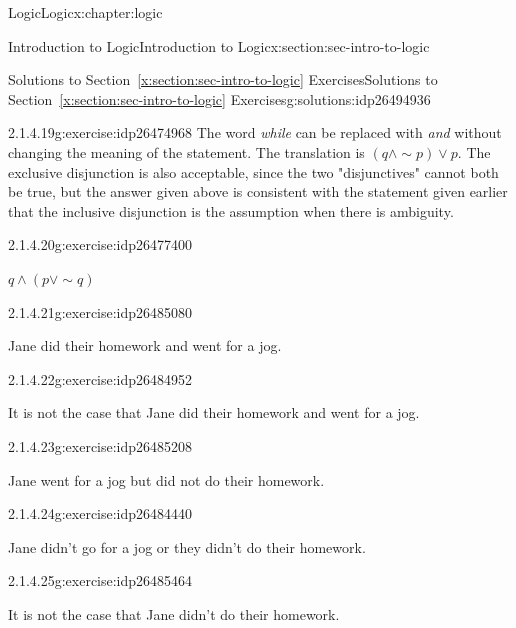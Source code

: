 \documentclass[twoside,10pt,]{book}
\newcommand{\xreffont}{\relax}
\numberwithin{equation}{section}
\begin{document}
\begin{chapterptx}{Logic}{}{Logic}{}{}{x:chapter:logic}
\begin{sectionptx}{Introduction to Logic}{}{Introduction to Logic}{}{}{x:section:sec-intro-to-logic}
\begin{solutions-subsection}{Solutions to Section~{\xreffont\ref*{x:section:sec-intro-to-logic}} Exercises}{}{Solutions to Section~{\xreffont\ref*{x:section:sec-intro-to-logic}} Exercises}{}{}{g:solutions:idp26494936}
\begin{exercisegroup}
\begin{divisionsolutioneg}{2.1.4.19}{}{g:exercise:idp26474968}
\noindent\hypertarget{g:solution:idp26481112-main}{}The word \emph{while} can be replaced with \emph{and} without changing the meaning of the statement. The translation is \((q{\wedge} \sim\!{p}){\vee} p\).  The exclusive disjunction is also acceptable, since the two "disjunctives" cannot both be true, but the answer given above is consistent with the statement given earlier that the inclusive disjunction is the assumption when there is ambiguity.\end{divisionsolutioneg}%
\begin{divisionsolutioneg}{2.1.4.20}{}{g:exercise:idp26477400}%
\par\smallskip%
\noindent\hypertarget{g:solution:idp26482648-main}{}\(q{\wedge} (p{\vee}\sim\!{q})\)\end{divisionsolutioneg}%
\end{exercisegroup}
\par\medskip\noindent
\begin{exercisegroup}
\begin{divisionsolutioneg}{2.1.4.21}{}{g:exercise:idp26485080}%
\par\smallskip%
\noindent\hypertarget{g:solution:idp26487384-main}{}Jane did their homework and went for a jog.\end{divisionsolutioneg}%
\begin{divisionsolutioneg}{2.1.4.22}{}{g:exercise:idp26484952}%
\par\smallskip%
\noindent\hypertarget{g:solution:idp26488664-main}{}It is not the case that Jane did their homework and went for a jog.\end{divisionsolutioneg}%
\begin{divisionsolutioneg}{2.1.4.23}{}{g:exercise:idp26485208}%
\par\smallskip%
\noindent\hypertarget{g:solution:idp26486104-main}{}Jane went for a jog but did not do their homework.\end{divisionsolutioneg}%
\begin{divisionsolutioneg}{2.1.4.24}{}{g:exercise:idp26484440}%
\par\smallskip%
\noindent\hypertarget{g:solution:idp26483544-main}{}Jane didn't go for a jog or they didn't do their homework.\end{divisionsolutioneg}%
\begin{divisionsolutioneg}{2.1.4.25}{}{g:exercise:idp26485464}%
\par\smallskip%
\noindent\hypertarget{g:solution:idp26485336-main}{}It is not the case that Jane didn't do their homework.\end{divisionsolutioneg}%

\end{exercisegroup}
\end{solutions-subsection}
\end{sectionptx}
\end{chapterptx}
\end{document}
